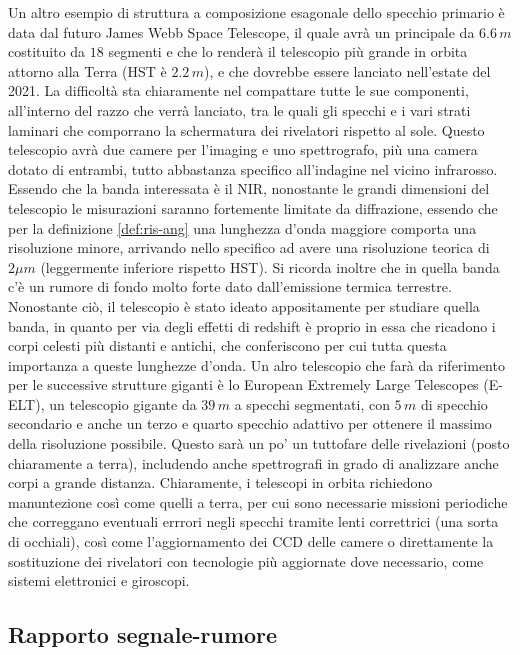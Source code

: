 Un altro esempio di struttura a composizione esagonale dello specchio primario è data dal futuro James Webb Space Telescope, il quale avrà un principale da $6.6\, m$ costituito da $18$ segmenti e che lo renderà il telescopio più grande in orbita attorno alla Terra (HST è $2.2\, m$), e che dovrebbe essere lanciato nell'estate del 2021. La difficoltà sta chiaramente nel compattare tutte le sue componenti, all'interno del razzo che verrà lanciato, tra le quali gli specchi e i vari strati laminari che comporrano la schermatura dei rivelatori rispetto al sole. Questo telescopio avrà due camere per l'imaging e uno spettrografo, più una camera dotato di entrambi, tutto abbastanza specifico all'indagine nel vicino infrarosso. Essendo che la banda interessata è il NIR, nonostante le grandi dimensioni del telescopio le misurazioni saranno fortemente limitate da diffrazione, essendo che per la definizione \ref{def:ris-ang} una lunghezza d'onda maggiore comporta una risoluzione minore, arrivando nello specifico ad avere una risoluzione teorica di $2\mu m$ (leggermente inferiore rispetto HST). Si ricorda inoltre che in quella banda c'è un rumore di fondo molto forte dato dall'emissione termica terrestre. Nonostante ciò, il telescopio è stato ideato appositamente per studiare quella banda, in quanto per via degli effetti di redshift è proprio in essa che ricadono i corpi celesti più distanti e antichi, che conferiscono per cui tutta questa importanza a queste lunghezze d'onda. Un alro telescopio che farà da riferimento per le successive strutture giganti è lo European Extremely Large Telescopes (E-ELT), un telescopio gigante da $39\, m$ a specchi segmentati, con $5\, m$ di specchio secondario e anche un terzo e quarto specchio adattivo per ottenere il massimo della risoluzione possibile. Questo sarà un po' un tuttofare delle rivelazioni (posto chiaramente a terra), includendo anche spettrografi in grado di analizzare anche corpi a grande distanza. Chiaramente, i telescopi in orbita richiedono manuntezione così come quelli a terra, per cui sono necessarie missioni periodiche che correggano eventuali errrori negli specchi tramite lenti correttrici (una sorta di occhiali), così come l'aggiornamento dei CCD delle camere o direttamente la sostituzione dei rivelatori con tecnologie più aggiornate dove necessario, come sistemi elettronici e giroscopi.

\subsection*{Rapporto segnale-rumore}

